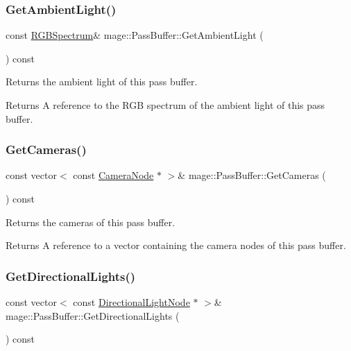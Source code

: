 \subsubsection{\texorpdfstring{Get\+Ambient\+Light()}{GetAmbientLight()}}
{\footnotesize\ttfamily const \hyperlink{structmage_1_1_r_g_b_spectrum}{R\+G\+B\+Spectrum}\& mage\+::\+Pass\+Buffer\+::\+Get\+Ambient\+Light (\begin{DoxyParamCaption}{ }\end{DoxyParamCaption}) const\hspace{0.3cm}{\ttfamily [noexcept]}}

Returns the ambient light of this pass buffer.

\begin{DoxyReturn}{Returns}
A reference to the R\+GB spectrum of the ambient light of this pass buffer. 
\end{DoxyReturn}
\hypertarget{structmage_1_1_pass_buffer_a1b3745dab0028b470c76c695e55f6466}{}\label{structmage_1_1_pass_buffer_a1b3745dab0028b470c76c695e55f6466} 
\subsubsection{\texorpdfstring{Get\+Cameras()}{GetCameras()}}
{\footnotesize\ttfamily const vector$<$ const \hyperlink{classmage_1_1_camera_node}{Camera\+Node} $\ast$ $>$\& mage\+::\+Pass\+Buffer\+::\+Get\+Cameras (\begin{DoxyParamCaption}{ }\end{DoxyParamCaption}) const\hspace{0.3cm}{\ttfamily [noexcept]}}

Returns the cameras of this pass buffer.

\begin{DoxyReturn}{Returns}
A reference to a vector containing the camera nodes of this pass buffer. 
\end{DoxyReturn}
\hypertarget{structmage_1_1_pass_buffer_a23f032aeb9541e26997fb7009473ae3d}{}\label{structmage_1_1_pass_buffer_a23f032aeb9541e26997fb7009473ae3d} 
\subsubsection{\texorpdfstring{Get\+Directional\+Lights()}{GetDirectionalLights()}}
{\footnotesize\ttfamily const vector$<$ const \hyperlink{namespacemage_a7637b5351fc0f66a10badd80ebb35899}{Directional\+Light\+Node} $\ast$ $>$\& mage\+::\+Pass\+Buffer\+::\+Get\+Directional\+Lights (\begin{DoxyParamCaption}{ }\end{DoxyParamCaption}) const\hspace{0.3cm}{\ttfamily [noexcept]}}

